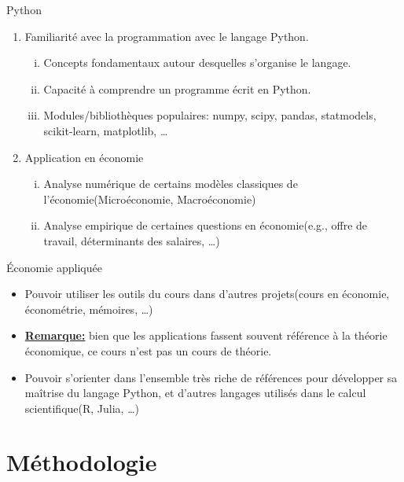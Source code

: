 \documentclass[notes, ignorenonframetext, compress, 10pt, xcolor=svgnames, aspectratio=169]{beamer}
\begin{document}
\begin{frame}[allowframebreaks]{Python}
\begin{enumerate}
    \item Familiarité avec la programmation avec le langage Python.
    \begin{enumerate}[(i)]
        \item Concepts fondamentaux autour desquelles s'organise le langage.
        \item Capacité à comprendre un programme écrit en Python.
        \item Modules/bibliothèques populaires: numpy, scipy, pandas, statmodels, scikit-learn, matplotlib, \ldots
    \end{enumerate}
    \item Application en économie
    \begin{enumerate}[(i)]
        \item Analyse numérique de certains modèles classiques de l'économie(Microéconomie, Macroéconomie)
        \item Analyse empirique de certaines questions en économie(e.g., offre de travail, déterminants des salaires, \ldots)
    \end{enumerate}
\end{enumerate}
\end{frame}

\begin{frame}[allowframebreaks]{\'Economie appliquée}
    \begin{itemize}
        \item Pouvoir utiliser les outils du cours dans d'autres projets(cours en économie, économétrie, mémoires, \ldots)
        \item \underline{\textbf{Remarque:}} bien que les applications fassent souvent référence à la théorie économique,
         ce cours n'est pas un cours de théorie.
         \item Pouvoir s'orienter dans l'ensemble très riche de références pour développer sa maîtrise du langage Python, 
         et d'autres langages utilisés dans le calcul scientifique(R, Julia, \ldots)
    \end{itemize}
\end{frame}

\section{Méthodologie}
\frame{\sectionpage}
\end{document}
